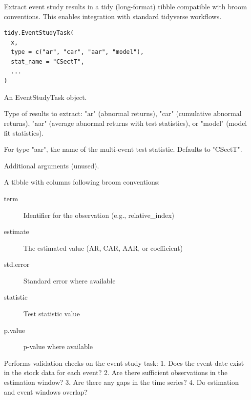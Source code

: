 \documentclass[a4paper]{book}
\begin{document}
%
\begin{Description}
Extract event study results in a tidy (long-format) tibble compatible
with broom conventions. This enables integration with standard tidyverse
workflows.
\end{Description}
%
\begin{Usage}
\begin{verbatim}
tidy.EventStudyTask(
  x,
  type = c("ar", "car", "aar", "model"),
  stat_name = "CSectT",
  ...
)
\end{verbatim}
\end{Usage}
%
\begin{Arguments}
\begin{ldescription}
\item[\code{x}] An EventStudyTask object.

\item[\code{type}] Type of results to extract: "ar" (abnormal returns),
"car" (cumulative abnormal returns), "aar" (average abnormal returns
with test statistics), or "model" (model fit statistics).

\item[\code{stat\_name}] For type "aar", the name of the multi-event test statistic.
Defaults to "CSectT".

\item[\code{...}] Additional arguments (unused).
\end{ldescription}
\end{Arguments}
%
\begin{Value}
A tibble with columns following broom conventions:
\begin{description}

\item[term] Identifier for the observation (e.g., relative\_index)
\item[estimate] The estimated value (AR, CAR, AAR, or coefficient)
\item[std.error] Standard error where available
\item[statistic] Test statistic value
\item[p.value] p-value where available

\end{description}

\end{Value}
%
\begin{Description}
Performs validation checks on the event study task:
1. Does the event date exist in the stock data for each event?
2. Are there sufficient observations in the estimation window?
3. Are there any gaps in the time series?
4. Do estimation and event windows overlap?
\end{Description}
\end{document}
